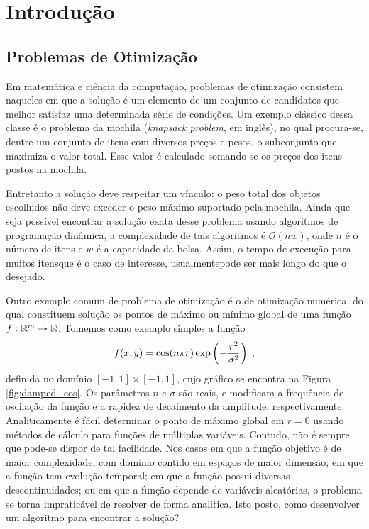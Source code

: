 \chapter{Introdução}\label{cap_introducao}

\section{Problemas de Otimização}

Em matemática e ciência da computação, problemas de otimização consistem naqueles em que
a solução é um elemento de um conjunto de candidatos que melhor satisfaz uma determinada
série de condições. Um exemplo clássico dessa classe é o problema da mochila 
(\textit{knapsack problem}, em inglês), no qual
procura-se, dentre um conjunto de itens com diversos preços e pesos, o subconjunto que
maximiza o valor total. Esse valor é calculado somando-se os preços dos itens postos na
mochila. 

Entretanto a solução deve respeitar um vínculo: o peso total dos objetos escolhidos
não deve exceder o peso máximo suportado pela mochila. Ainda que seja possível encontrar a solução exata
desse problema usando algoritmos de programação dinâmica,
a complexidade de tais algoritmos é $ \mathcal{O} (n w) $, onde $n$ é o número de itens e $w$ é a
capacidade da bolsa. Assim, o tempo de execução para muitos itens\trav que é o caso de interesse,
usualmente\trav pode ser mais longo do que o desejado.

Outro exemplo comum de problema de otimização é o de otimização numérica, do qual constituem
solução os pontos de máximo ou mínimo global de uma função 
$ f : \mathbb{R}^m \rightarrow \mathbb{R} $. Tomemos como exemplo simples a função
\begin{equation}
  f(x, y) = \cos(n\pi r)\exp\left(-\frac{r^2}{\sigma^2}\right) \;\mathrm{,}
  \label{eq:damped_cos}
\end{equation}
definida no domínio $ [-1, 1] \times [-1, 1] $, cujo gráfico se encontra na Figura \ref{fig:damped_cos}.
Os parâmetros $n$ e $\sigma$ são reais, e modificam a frequência de oscilação da função e a rapidez
de decaimento da amplitude, respectivamente.
Analiticamente é fácil determinar o ponto de máximo global em $ r = 0 $ usando métodos de cálculo
para funções de múltiplas variáveis. 
Contudo, não é sempre que pode-se dispor de tal facilidade. 
Nos casos em que a função objetivo é de maior complexidade, com domínio contido em espaços de maior dimensão; 
em que a função tem evolução temporal; em que a função possui diversas descontinuidades; ou em que a função
depende de variáveis aleatórias, o problema se torna impraticável de resolver de forma analítica. 
Isto posto, como desenvolver um algoritmo para encontrar a solução?

